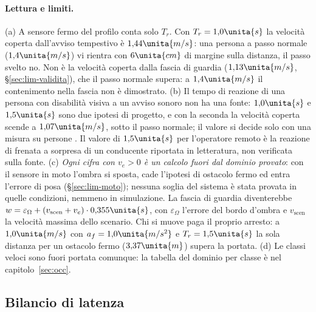\paragraph{Lettura e limiti.} (a) A sensore fermo del profilo conta solo $T_r$. Con $T_r=1{,}0\unita{s}$ la velocità coperta dall'avviso tempestivo è $1{,}44\unita{m/s}$: una persona a passo normale ($1{,}4\unita{m/s}$) vi rientra con $6\unita{cm}$ di margine sulla distanza, il passo svelto no. Non è la velocità coperta dalla fascia di guardia ($1{,}13\unita{m/s}$, \S\ref{sec:lim-validita}), che il passo normale supera: a $1{,}4\unita{m/s}$ il contenimento nella fascia non è dimostrato. (b) Il tempo di reazione di una persona con disabilità visiva a un avviso sonoro non ha una fonte: $1{,}0\unita{s}$ e $1{,}5\unita{s}$ sono due ipotesi di progetto, e con la seconda la velocità coperta scende a $1{,}07\unita{m/s}$, sotto il passo normale; il valore si decide solo con una misura su persone . Il valore di $1{,}5\unita{s}$ per l'operatore remoto è la reazione di frenata a sorpresa di un conducente riportata in letteratura, non verificata sulla fonte. (c) \emph{Ogni cifra con $v_e>0$ è un calcolo fuori dal dominio provato}: con il sensore in moto l'ombra si sposta, cade l'ipotesi di ostacolo fermo ed entra l'errore di posa (\S\ref{sec:lim-moto}); nessuna soglia del sistema è stata provata in quelle condizioni, nemmeno in simulazione. La fascia di guardia diventerebbe $w=\varepsilon_\Omega+(v_{\mathrm{scen}}+v_e)\cdot0{,}355\unita{s}$, con $\varepsilon_\Omega$ l'errore del bordo d'ombra e $v_{\mathrm{scen}}$ la velocità massima dello scenario. Chi si muove paga il proprio arresto: a $1{,}0\unita{m/s}$ con $a_f=1{,}0\unita{m/s^2}$ e $T_r=1{,}5\unita{s}$ la sola distanza per un ostacolo fermo ($3{,}37\unita{m}$) supera la portata. (d) Le classi veloci sono fuori portata comunque: la tabella del dominio per classe è nel capitolo~\ref{sec:occ}.

\subsection{Bilancio di latenza}\label{sec:lim-latenza}

